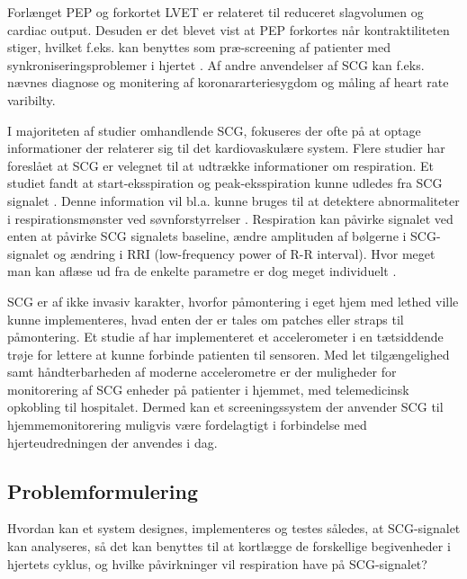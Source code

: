 Forlænget PEP og forkortet LVET er relateret til reduceret slagvolumen og cardiac output. Desuden er det blevet vist at PEP forkortes når kontraktiliteten stiger, hvilket f.eks. kan benyttes som præ-screening af patienter med synkroniseringsproblemer i hjertet  \cite{zanetti}  \cite{abra}. Af andre anvendelser af SCG kan f.eks. nævnes diagnose og monitering af koronararteriesygdom og måling af heart rate varibilty.

I majoriteten af studier omhandlende SCG, fokuseres der ofte på at optage informationer der relaterer sig til det kardiovaskulære system. Flere studier har foreslået at SCG er velegnet til at udtrække informationer om respiration. Et studiet fandt at start-eksspiration og peak-eksspiration kunne udledes fra SCG signalet \cite{pandia} \cite{magic}. Denne information vil  bl.a. kunne bruges til at detektere abnormaliteter i respirationsmønster ved søvnforstyrrelser \cite{tavaloka}. Respiration kan påvirke signalet ved enten at påvirke SCG signalets baseline, ændre amplituden af bølgerne i SCG-signalet og ændring i RRI (low-frequency power of R-R interval). Hvor meget man kan aflæse ud fra de enkelte parametre er dog meget individuelt \cite{magic}.

 SCG er af ikke invasiv karakter, hvorfor påmontering i eget hjem med lethed ville kunne implementeres, hvad enten der er tales om patches eller straps til påmontering. Et studie af \cite{Wearable} har implementeret et accelerometer i en tætsiddende trøje for lettere at kunne forbinde patienten til sensoren. Med let tilgængelighed samt håndterbarheden af moderne accelerometre  er der muligheder for monitorering af SCG enheder på patienter i hjemmet, med telemedicinsk opkobling til hospitalet. Dermed kan et screeningssystem der anvender SCG til hjemmemonitorering muligvis være fordelagtigt i forbindelse med hjerteudredningen der anvendes i dag.

\subsection{Problemformulering}
Hvordan kan et system designes, implementeres og testes således, at SCG-signalet kan  analyseres, så det kan benyttes til at kortlægge de forskellige begivenheder i hjertets cyklus, og hvilke påvirkninger vil respiration have på SCG-signalet?